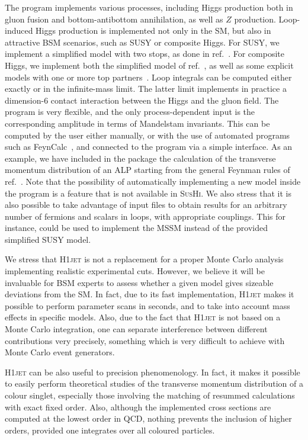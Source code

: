 \documentclass[12pt]{article}
\begin{document}
The program implements various processes, including Higgs production
both in gluon fusion and bottom-antibottom annihilation, as well as
$Z$ production. Loop-induced Higgs production is implemented not only
in the SM, but also in attractive BSM scenarios, such as SUSY or
composite Higgs. For SUSY, we implement a simplified model with two
stops, as done in ref.~\cite{Banfi:2018pki}. For composite Higgs, we
implement both the simplified model of ref.~\cite{Banfi:2013yoa}, as
well as some explicit models with one or more top
partners~\cite{Banfi:2019xai}. Loop integrals can be computed either
exactly or in the infinite-mass limit. The latter limit implements in
practice a dimension-6 contact interaction between the Higgs and the
gluon field. The program is very flexible, and the only
process-dependent input is the corresponding amplitude in terms of
Mandelstam invariants. This can be computed by the user either
manually, or with the use of automated programs such as
FeynCalc~\cite{Shtabovenko:2020gxv}, and connected to the program via
a simple interface. As an example, we have included in the package the
calculation of the transverse momentum distribution of an ALP starting
from the general Feynman rules of ref.~\cite{Brivio:2017ije}. Note
that the possibility of automatically implementing a new model inside
the program is a feature that is not available in \textsc{SusHi}. We
also stress that it is also possible to take advantage of input files
to obtain results for an arbitrary number of fermions and scalars in
loops, with appropriate couplings. This for instance, could be used to
implement the MSSM instead of the provided simplified SUSY model.

We stress that \textsc{H1jet} is not a replacement for a proper Monte Carlo
analysis implementing realistic experimental cuts. However, we believe
it will be invaluable for BSM experts to assess whether a given model
gives sizeable deviations from the SM. In fact, due to its fast
implementation, \textsc{H1jet} makes it possible to perform parameter scans in
seconds, and to take into account mass effects in specific
models. Also, due to the fact that \textsc{H1jet} is not based on a Monte Carlo
integration, one can separate interference between different
contributions very precisely, something which is very difficult to
achieve with Monte Carlo event generators.

\textsc{H1jet} can be also useful to precision phenomenology. In fact, it makes
it possible to easily perform theoretical studies of the transverse
momentum distribution of a colour singlet, especially those involving
the matching of resummed calculations with exact fixed order. Also,
although the implemented cross sections are computed at the lowest
order in QCD, nothing prevents the inclusion of higher orders, provided one
integrates over all coloured particles. 
\end{document}
